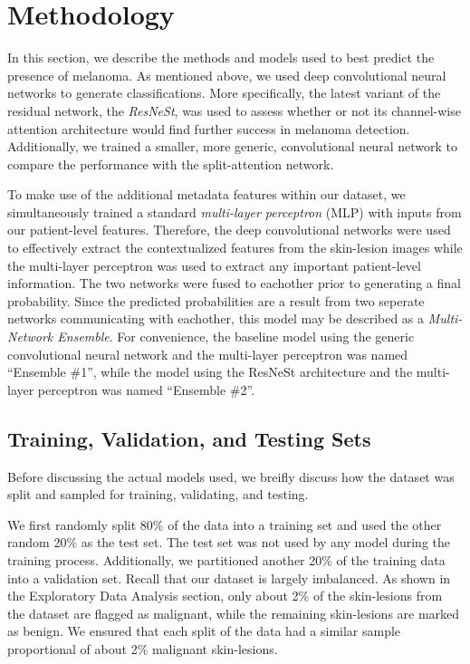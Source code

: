 \documentclass [MAS] {uclathes}
\begin{document}
\chapter{Methodology}

In this section, we describe the methods and models used to best predict the presence of melanoma. As mentioned above, we used deep convolutional neural networks to generate classifications. More specifically, the latest variant of the residual network, the \textit{ResNeSt}, was used to assess whether or not its channel-wise attention architecture would find further success in melanoma detection. Additionally, we trained a smaller, more generic, convolutional neural network to compare the performance with the split-attention network. 

To make use of the additional metadata features within our dataset, we simultaneously trained a standard \textit{multi-layer perceptron} (MLP) with inputs from our patient-level features. Therefore, the deep convolutional networks were used to effectively extract the contextualized features from the skin-lesion images while the multi-layer perceptron was used to extract any important patient-level information. The two networks were fused to eachother prior to generating a final probability. Since the predicted probabilities are a result from two seperate networks communicating with eachother, this model may be described as a \textit{Multi-Network Ensemble}. For convenience, the baseline model using the generic convolutional neural network and the multi-layer perceptron was named ``Ensemble \#1'', while the model using the ResNeSt architecture and the multi-layer perceptron was named ``Ensemble \#2''.

\section{Training, Validation, and Testing Sets}

Before discussing the actual models used, we breifly discuss how the dataset was split and sampled for training, validating, and testing.

We first randomly split 80\% of the data into a training set and used the other random 20\% as the test set. The test set was
not used by any model during the training process. Additionally, we partitioned another 20\% of the training data into a validation set. Recall that our dataset is largely imbalanced. As shown in the Exploratory Data Analysis section, only about 2\% of the skin-lesions from the dataset are flagged as malignant, while the remaining skin-lesions are marked as benign. We ensured that each split of the data had a similar sample proportional of about 2\% malignant skin-lesions.
\end{document}
